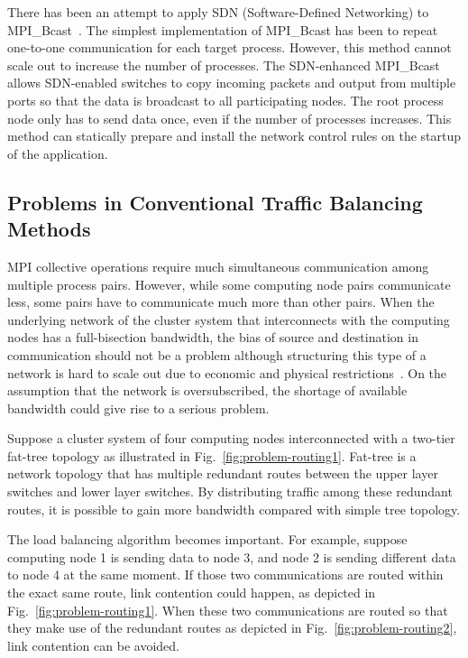 There has been an attempt to apply SDN (Software-Defined Networking) to
MPI\_Bcast~\autocite{Dashdavaa2013}. The simplest implementation of MPI\_Bcast has
been to repeat one-to-one communication for each target process. However, this
method cannot scale out to increase the number of processes. The SDN-enhanced
MPI\_Bcast allows SDN-enabled switches to copy incoming packets and output
from multiple ports so that the data is broadcast to all participating nodes.
The root process node only has to send data once, even if the number of
processes increases. This method can statically prepare and install the
network control rules on the startup of the application.

\subsection{Problems in Conventional Traffic Balancing Methods}

MPI collective operations require much simultaneous communication among
multiple process pairs. However, while some computing node pairs
communicate less, some pairs have to communicate much more than other
pairs. When the underlying network of the cluster system that
interconnects with the computing nodes has a full-bisection bandwidth,
the bias of source and destination in communication should not be a
problem although structuring this type of a network is hard to scale out
due to economic and physical restrictions~\autocite{Al-Fares2008}. On the
assumption that the network is oversubscribed, the shortage of available
bandwidth could give rise to a serious problem.

Suppose a cluster system of four computing nodes interconnected with a
two-tier fat-tree topology as illustrated in Fig.~\ref{fig:problem-routing1}.
Fat-tree is a network topology that has multiple redundant routes between the
upper layer switches and lower layer switches. By distributing traffic among
these redundant routes, it is possible to gain more bandwidth compared with
simple tree topology.

The load balancing algorithm becomes important. For example, suppose
computing node 1 is sending data to node 3, and node 2 is sending
different data to node 4 at the same moment. If those two communications
are routed within the exact same route, link contention could happen, as
depicted in Fig.~\ref{fig:problem-routing1}. When these two
communications are routed so that they make use of the redundant routes
as depicted in Fig.~\ref{fig:problem-routing2}, link contention can be
avoided.

